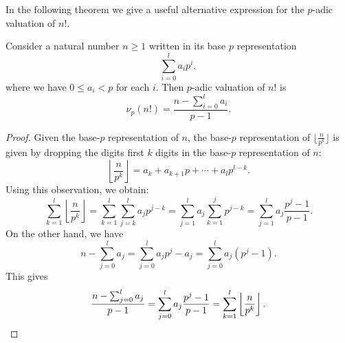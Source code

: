 In the following theorem we give a useful alternative expression for the $p$-adic valuation of $n!$.

\begin{theorem}\label{theorem:de-polignacs-formula}
  Consider a natural number $n\geq 1$ written in its base $p$ representation
  \begin{equation*}
    \sum_{i=0}^{l} a_ip^i,
  \end{equation*}
  where we have $0\leq a_i<p$ for each $i$. Then $p$-adic valuation of $n!$ is
  \begin{equation*}
    \nu_p(n!) = \frac{n-\sum_{i=0}^{l} a_i}{p-1}.
  \end{equation*}
\end{theorem}

\begin{proof}
  Given the base-$p$ representation of $n$, the base-$p$ representation of $\lfloor\frac{n}{p^k}\rfloor$ is given by dropping the digits first $k$ digits in the base-$p$ representation of $n$:
  \begin{equation*}
    \left\lfloor\frac{n}{p^k}\right\rfloor = a_k + a_{k+1}p +\cdots + a_lp^{l-k}.
  \end{equation*}
  Using this observation, we obtain:
  \begin{equation*}
    \sum_{k=1}^{l}\left\lfloor\frac{n}{p^k}\right\rfloor
    = \sum_{k=1}^{l}\sum_{j=k}^{l}a_jp^{j-k}
    = \sum_{j=1}^la_j\sum_{k=1}^{j}p^{j-k}
    = \sum_{j=1}^la_j\frac{p^j-1}{p-1}.
  \end{equation*}
  On the other hand, we have
  \begin{equation*}
    n-\sum_{j=0}^l a_j = \sum_{j=0}^l a_jp^j-a_j = \sum_{j=0}^l a_j(p^j-1).
  \end{equation*}
  This gives
  \begin{equation*}
    \frac{n-\sum_{j=0}^l a_j}{p-1} = \sum_{j=0}^l a_j\frac{p^j-1}{p-1}=
    \sum_{k=1}^{l}\left\lfloor\frac{n}{p^k}\right\rfloor.\qedhere
  \end{equation*}
\end{proof}

